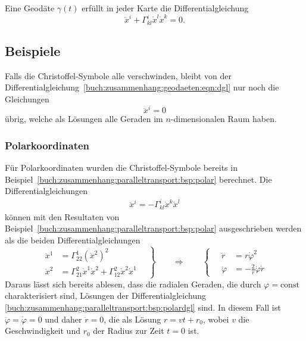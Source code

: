 \begin{satz}
Eine Geodäte $\gamma(t)$ erfüllt in jeder Karte die Differentialgleichung
\begin{equation}
\ddot{x}^i
+
\Gamma^i_{kl} \dot{x}^l \dot{x}^k
=
0.
\label{buch:zusammenhang:geodaeten:eqn:dgl}
\end{equation}
\end{satz}

%
%
\subsection{Beispiele
\label{buch:zusammenhang:geodaeten:subsection:beispiele}}
Falls die Christoffel-Symbole alle verschwinden, bleibt von der
Differentialgleichung~\eqref{buch:zusammenhang:geodaeten:eqn:dgl}
nur noch die Gleichungen
\[
\ddot{x}^i = 0
\]
übrig, welche als Lösungen alle Geraden im $n$-dimensionalen
Raum haben.

\subsubsection{Polarkoordinaten}
Für Polarkoordinaten wurden die Christoffel-Symbole bereits
in Beispiel~\ref{buch:zusammenhang:paralleltransport:bsp:polar}
berechnet.
Die Differentialgleichungen
\begin{align*}
\ddot{x}^i=-\Gamma^i_{kl}\dot{x}^k\dot{x}^l
\end{align*}
können mit den Resultaten von 
Beispiel~\ref{buch:zusammenhang:paralleltransport:bsp:polar}
ausgeschrieben werden als die beiden Differentialgleichungen
\begin{equation}
\left.
\begin{aligned}
\ddot{x}^1
&=
\Gamma^1_{22}(\dot{x}^2)^2
\\
\ddot{x}^2
&=
\Gamma^2_{21}\dot{x}^1\dot{x}^2
+
\Gamma^2_{12}\dot{x}^2\dot{x}^1
\end{aligned}
\quad
\right\}
\qquad
\Rightarrow
\qquad
\left\{
\quad
\begin{aligned}
\ddot{r}
&=
r \dot{\varphi}^2
\\
\ddot{\varphi}
&=
-\frac{2}{r}\dot{\varphi}\dot{r}
\end{aligned}
\right.
\label{buch:zusammenhang:paralleltransport:bsp:polardgl}
\end{equation}
Daraus lässt sich bereits ablesen, dass die radialen Geraden, die
durch $\varphi=\text{const}$ charakterisiert sind, Lösungen
der Differentialgleichung
\eqref{buch:zusammenhang:paralleltransport:bsp:polardgl}
sind.
In diesem Fall ist $\ddot{\varphi}=\dot{\varphi}=0$ und
daher $\ddot{r}=0$, die als Lösung $r=vt+r_0$, wobei $v$ die Geschwindigkeit
und $r_0$ der Radius zur Zeit $t=0$ ist.

